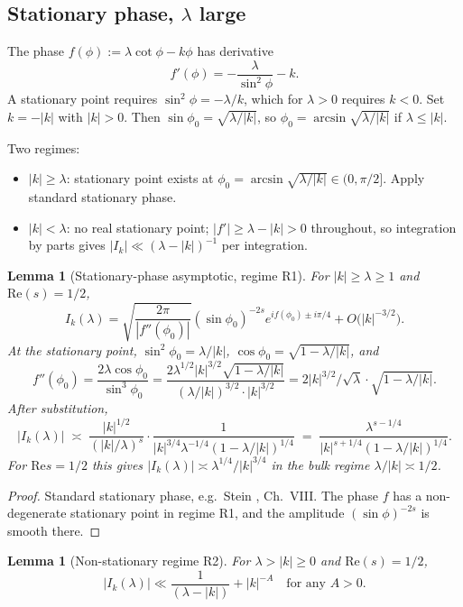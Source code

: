 \documentclass[11pt]{article}
\newtheorem{lemma}[theorem]{Lemma}
\theoremstyle{definition}
\renewcommand{\Re}{\mathrm{Re}}
\begin{document}
\subsection{Stationary phase, $\lambda$ large}

The phase $f(\phi):=\lambda\cot\phi-k\phi$ has derivative
\[
f'(\phi)=-\frac{\lambda}{\sin^2\phi}-k.
\]
A stationary point requires $\sin^2\phi=-\lambda/k$, which for $\lambda>0$ requires $k<0$. Set $k=-|k|$ with $|k|>0$. Then $\sin\phi_0=\sqrt{\lambda/|k|}$, so $\phi_0=\arcsin\sqrt{\lambda/|k|}$ if $\lambda\le|k|$.

Two regimes:
\begin{itemize}
\item[\textbf{(R1)}] $|k|\ge\lambda$: stationary point exists at $\phi_0=\arcsin\sqrt{\lambda/|k|}\in(0,\pi/2]$. Apply standard stationary phase.
\item[\textbf{(R2)}] $|k|<\lambda$: no real stationary point; $|f'|\ge\lambda-|k|>0$ throughout, so integration by parts gives $|I_k|\ll(\lambda-|k|)^{-1}$ per integration.
\end{itemize}

\begin{lemma}[Stationary-phase asymptotic, regime R1]\label{lem:stat-phase}
For $|k|\ge\lambda\ge 1$ and $\Re(s)=1/2$,
\[
I_k(\lambda)=\sqrt{\frac{2\pi}{|f''(\phi_0)|}}(\sin\phi_0)^{-2s}e^{if(\phi_0)\pm i\pi/4}+O\big(|k|^{-3/2}\big).
\]
At the stationary point, $\sin^2\phi_0=\lambda/|k|$, $\cos\phi_0=\sqrt{1-\lambda/|k|}$, and
\[
f''(\phi_0)=\frac{2\lambda\cos\phi_0}{\sin^3\phi_0}=\frac{2\lambda^{1/2}|k|^{3/2}\sqrt{1-\lambda/|k|}}{(\lambda/|k|)^{3/2}\cdot|k|^{3/2}}=2|k|^{3/2}/\sqrt\lambda\cdot\sqrt{1-\lambda/|k|}.
\]
After substitution,
\[
\bigl|I_k(\lambda)\bigr|\;\asymp\;\frac{|k|^{1/2}}{(|k|/\lambda)^{s}}\cdot\frac{1}{|k|^{3/4}\lambda^{-1/4}(1-\lambda/|k|)^{1/4}}\;=\;\frac{\lambda^{s-1/4}}{|k|^{s+1/4}(1-\lambda/|k|)^{1/4}}.
\]
For $\Re s=1/2$ this gives $|I_k(\lambda)|\asymp \lambda^{1/4}/|k|^{3/4}$ in the bulk regime $\lambda/|k|\asymp 1/2$.
\end{lemma}

\begin{proof}
Standard stationary phase, e.g.\ Stein \cite{stein-harmonic}, Ch.\ VIII. The phase $f$ has a non-degenerate stationary point in regime R1, and the amplitude $(\sin\phi)^{-2s}$ is smooth there.
\end{proof}

\begin{lemma}[Non-stationary regime R2]\label{lem:non-stat}
For $\lambda>|k|\ge 0$ and $\Re(s)=1/2$,
\[
|I_k(\lambda)|\ll \frac{1}{(\lambda-|k|)}+|k|^{-A}\quad\text{for any }A>0.
\]
\end{lemma}
\end{document}
